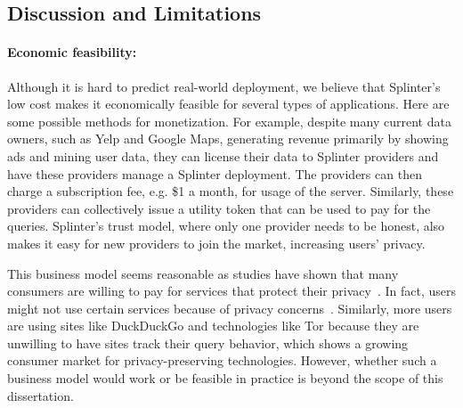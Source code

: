 \subsection{Discussion and Limitations}
\label{spl-sec:discussion}

\paragraph{Economic feasibility:}
\label{sec:disc-economics}

Although it is hard to predict real-world deployment, we believe that Splinter's low cost makes it economically feasible for several types of applications.
Here are some possible methods for monetization.
For example, despite many current data owners, such as Yelp and Google Maps, generating revenue primarily by showing ads and mining user data,
they can license their data to Splinter providers and have these providers manage a Splinter deployment. The providers
can then charge a subscription fee, e.g. \$1 a month, for usage of the server.
Similarly, these providers can collectively issue a utility token that
can be used to pay for the queries.
Splinter's trust model, where only one provider needs to be honest, also makes 
it easy for new providers to join the market, increasing users' privacy.

This business model seems reasonable as studies have shown that 
many consumers are willing to pay for services that protect their privacy~\cite{atlantic,atlantic2}. 
In fact, users might not use certain services because of privacy concerns~\cite{ravichandran2009capturing,riley2008tolls}.
Similarly, more users are using sites like DuckDuckGo and technologies like Tor 
because they are unwilling to have sites track their
query behavior, which shows a growing consumer market for privacy-preserving technologies. 
However, whether such a business model would work or be feasible 
in practice is beyond the scope of this dissertation.


